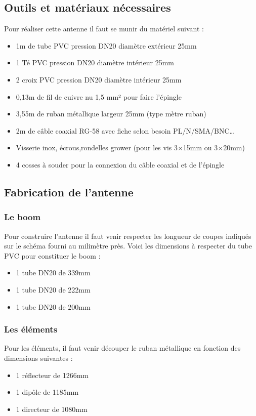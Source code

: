 \documentclass[12pt, a4paper]{article}
\begin{document}
\subsection{Outils et matériaux nécessaires}
Pour réaliser cette antenne il faut se munir 
du matériel suivant :\\
\begin{itemize}
    \item 1m de tube PVC pression DN20 diamètre extérieur 25mm
    \item 1 Té PVC pression DN20 diamètre intérieur 25mm
    \item 2 croix PVC pression DN20 diamètre intérieur 25mm
    \item 0,13m de fil de cuivre nu 1,5 mm² pour faire l’épingle
    \item 3,55m de ruban métallique largeur 25mm (type mètre ruban)
    \item 2m de câble coaxial RG-58 avec fiche selon besoin PL/N/SMA/BNC…
    \item Visserie inox, écrous,rondelles grower (pour les vis 3×15mm ou 3×20mm)
    \item 4 cosses à souder pour la connexion du câble coaxial et de l’épingle
\end{itemize}


\subsection{Fabrication de l'antenne}
\subsubsection{Le boom}
Pour construire l'antenne il faut venir respecter les 
longueur de coupes indiqués sur le schéma fourni 
au milimètre près. Voici les dimensions à respecter 
du tube PVC pour constituer le boom :\\
\begin{itemize}
    \item 1 tube DN20 de 339mm
    \item 1 tube DN20 de 222mm
    \item 1 tube DN20 de 200mm
\end{itemize}
\subsubsection{Les éléments}
Pour les éléments, il faut venir découper le ruban
métallique en fonction des dimensions suivantes :\\
\begin{itemize}
    \item 1 réflecteur de 1266mm
    \item 1 dipôle de 1185mm
    \item 1 directeur de 1080mm
\end{itemize}
\end{document}
